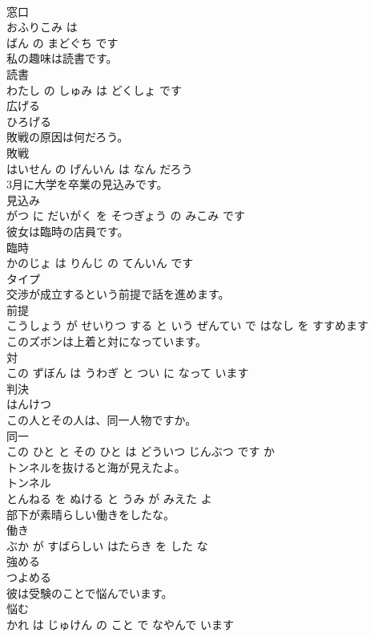 \documentclass[8pt]{extreport}
\begin{document}
\begin{CJK}{UTF8}{min}
\\	窓口 
\\	おふりこみ は 
\\	ばん の まどぐち です			
\\	私の趣味は読書です。	
\\	読書 
\\	わたし の しゅみ は どくしょ です			
\\	広げる	
\\	ひろげる			
\\	敗戦の原因は何だろう。	
\\	敗戦 
\\	はいせん の げんいん は なん だろう			
\\	3月に大学を卒業の見込みです。	
\\	見込み 
\\	がつ に だいがく を そつぎょう の みこみ です			
\\	彼女は臨時の店員です。	
\\	臨時 
\\	かのじょ は りんじ の てんいん です			
\\	タイプ	
\\	交渉が成立するという前提で話を進めます。	
\\	前提 
\\	こうしょう が せいりつ する と いう ぜんてい で はなし を すすめます			
\\	このズボンは上着と対になっています。	
\\	対 
\\	この ずぼん は うわぎ と つい に なって います			
\\	判決	
\\	はんけつ			
\\	この人とその人は、同一人物ですか。	
\\	同一 
\\	この ひと と その ひと は どういつ じんぶつ です か			
\\	トンネルを抜けると海が見えたよ。	
\\	トンネル 
\\	とんねる を ぬける と うみ が みえた よ			
\\	部下が素晴らしい働きをしたな。	
\\	働き 
\\	ぶか が すばらしい はたらき を した な			
\\	強める	
\\	つよめる			
\\	彼は受験のことで悩んでいます。	
\\	悩む 
\\	かれ は じゅけん の こと で なやんで います			

\end{CJK}
\end{document}
